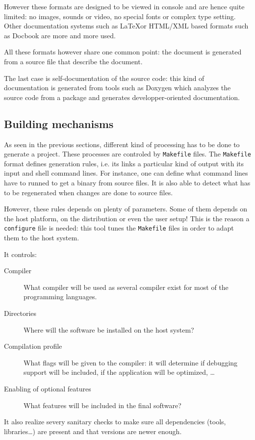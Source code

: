 However these formats are designed to be viewed in console and are
hence quite limited: no images, sounds or video, no special fonts or
complex type setting. Other documentation systems such as \LaTeX or
HTML/XML based formats such as Docbook are more and more used.


All these formats however share one common point: the document is
generated from a source file that describe the document.


The last case is self-documentation of the source code: this kind of
documentation is generated from tools such as Doxygen which analyzes
the source code from a package and generates developper-oriented
documentation.


\subsection{Building mechanisms}

As seen in the previous sections, different kind of processing has to
be done to generate a project. These processes are controled by
\texttt{Makefile} files. The \texttt{Makefile} format defines
generation rules, i.e. its links a particular kind of output with its
input and shell command lines. For instance, one can define what
command lines have to runned to get a binary from source files. It is
also able to detect what has to be regenerated when changes are done
to source files.


However, these rules depends on plenty of parameters. Some of them
depends on the host platform, on the \linux distribution or even the
user setup! This is the reason a \texttt{configure} file is needed:
this tool tunes the \texttt{Makefile} files in order to adapt them to
the host system.

It controls:
\begin{description}
\item[Compiler] What compiler will be used as several compiler exist
  for most of the programming languages.
\item[Directories] Where will the software be installed on the host
  system?
\item[Compilation profile] What flags will be given to the compiler:
  it will determine if debugging support will be included, if the
  application will be optimized, \ldots
\item[Enabling of optional features] What features will be included in
  the final software?
\end{description}

It also realize severy sanitary checks to make sure all dependencies
(tools, libraries\ldots) are present and that versions are newer
enough.